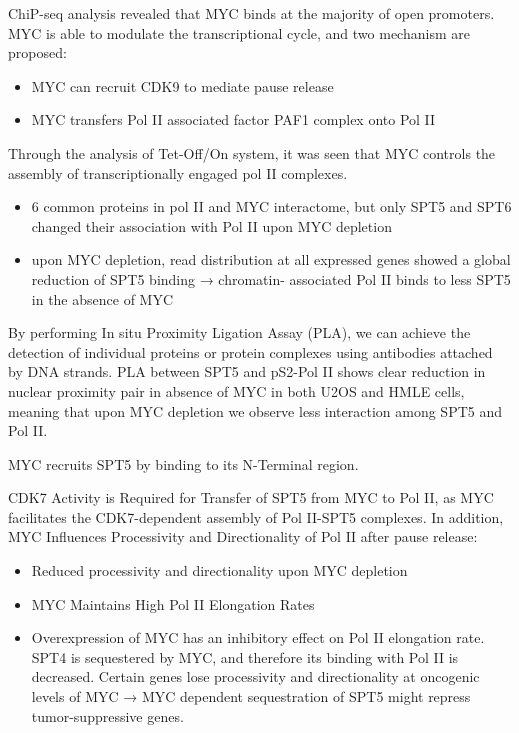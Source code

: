 ChiP-seq analysis revealed that MYC binds at the majority of open promoters. MYC is able to modulate the transcriptional cycle, and two mechanism are
proposed:

\begin{itemize}
\tightlist
\item
  MYC can recruit CDK9 to mediate pause release
\item
  MYC transfers Pol II associated factor PAF1 complex onto Pol II
\end{itemize}

Through the analysis of Tet-Off/On system, it was seen that MYC controls the assembly of transcriptionally engaged pol II complexes.
\begin{itemize}
\tightlist
\item
  6 common proteins in pol II and MYC interactome, but only SPT5 and SPT6 changed their association with Pol II upon MYC depletion
\item
  upon MYC depletion, read distribution at all expressed genes showed a
  global reduction of SPT5 binding → chromatin- associated Pol II binds
  to less SPT5 in the absence of MYC
\end{itemize}

By performing In situ Proximity Ligation Assay (PLA), we can achieve the detection of individual proteins or protein complexes using antibodies attached by DNA strands. PLA between SPT5 and pS2-Pol II shows clear reduction in nuclear proximity pair in absence of MYC in both U2OS and HMLE cells, meaning that upon MYC depletion we observe less interaction among SPT5 and Pol II. 

MYC recruits SPT5 by binding to its N-Terminal region.

CDK7 Activity is Required for Transfer of SPT5 from MYC to Pol II, as MYC facilitates the CDK7-dependent assembly of Pol II-SPT5 complexes.
In addition, MYC Influences Processivity and Directionality of Pol II after pause release:

\begin{itemize}
\tightlist
\item
  Reduced processivity and directionality upon MYC depletion
\item
  MYC Maintains High Pol II Elongation Rates
\item
  Overexpression of MYC has an inhibitory effect on Pol II elongation
  rate. SPT4 is sequestered by MYC, and therefore its binding with Pol
  II is decreased. Certain genes lose processivity and directionality at
  oncogenic levels of MYC → MYC dependent sequestration of SPT5 might
  repress tumor-suppressive genes.
\end{itemize}

